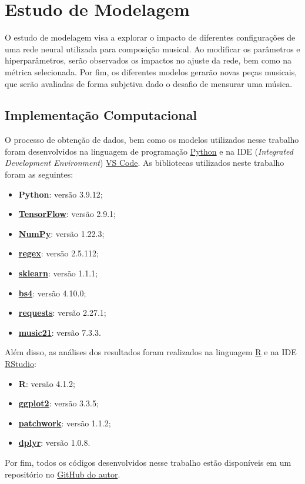\documentclass{automatextcc}
\begin{document}
\chapter{Estudo de Modelagem}
O estudo de modelagem visa a explorar o impacto de diferentes configurações de uma rede neural utilizada para composição musical. Ao modificar os parâmetros e hiperparâmetros, serão observados os impactos no ajuste da rede, bem como na métrica selecionada. Por fim, os diferentes modelos gerarão novas peças musicais, que serão avaliadas de forma subjetiva dado o desafio de mensurar uma música.



\section{Implementação Computacional}
\label{computacional}

O processo de obtenção de dados, bem como os modelos utilizados nesse trabalho foram desenvolvidos na linguagem de programação \href{https://python.org/}{Python} e na IDE (\textit{Integrated Development Environment}) \href{https://code.visualstudio.com}{VS Code}. As bibliotecas utilizados neste trabalho foram as seguintes:
\begin{itemize}
    \item \textbf{Python}: versão 3.9.12;
    \item \href{https://www.tensorflow.org/?hl=pt-br}{\textbf{TensorFlow}}: versão 2.9.1;
    \item \href{https://numpy.org}{\textbf{NumPy}}: versão 1.22.3;
    \item \href{https://pypi.org/project/regex/}{\textbf{regex}}: versão 2.5.112;
    \item \href{https://scikit-learn.org/stable/}{\textbf{sklearn}}: versão 1.1.1;
    \item \href{https://pypi.org/project/beautifulsoup4/}{\textbf{bs4}}: versão 4.10.0;
    \item \href{https://pypi.org/project/requests/}{\textbf{requests}}: versão 2.27.1;
    \item \href{https://web.mit.edu/music21/}{\textbf{music21}}: versão 7.3.3.
\end{itemize}
Além disso, as análises dos resultados foram realizados na linguagem \href{https://cran.r-project.org}{R} e na IDE \href{https://www.rstudio.com}{RStudio}:
\begin{itemize}
    \item \textbf{R}: versão 4.1.2;
    \item \href{https://ggplot2.tidyverse.org}{\textbf{ggplot2}}: versão 3.3.5;
    \item \href{https://patchwork.data-imaginist.com}{\textbf{patchwork}}: versão 1.1.2;
    \item \href{https://dplyr.tidyverse.org}{\textbf{dplyr}}: versão 1.0.8.
\end{itemize}
Por fim, todos os códigos desenvolvidos nesse trabalho estão disponíveis em um repositório no \href{https://github.com/nmhahn/TCC_NMH}{GitHub do autor}.
\end{document}
